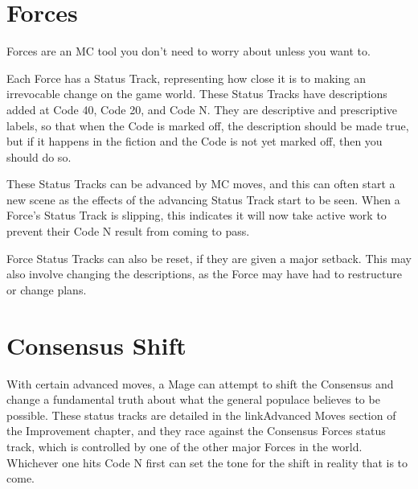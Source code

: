 \documentclass[
  oneside,
  statementpaper,
  9pt]{memoir}
\begin{document}
\hypertarget{forces-1}{%
\section{Forces}\label{forces-1}}

\begin{Player}

Forces are an MC tool you don't need to worry about unless you want to.

\end{Player}

\begin{MC}

Each Force has a Status Track, representing how close it is to making an irrevocable change on the game world. These Status Tracks have descriptions added at Code 40, Code 20, and Code N. They are descriptive and prescriptive labels, so that when the Code is marked off, the description should be made true, but if it happens in the fiction and the Code is not yet marked off, then you should do so.

These Status Tracks can be advanced by MC moves, and this can often start a new scene as the effects of the advancing Status Track start to be seen. When a Force’s Status Track is slipping, this indicates it will now take active work to prevent their Code N result from coming to pass.

Force Status Tracks can also be reset, if they are given a major setback. This may also involve changing the descriptions, as the Force may have had to restructure or change plans.

\end{MC}

\hypertarget{consensus-shift}{%
\section{Consensus Shift}\label{consensus-shift}}

\begin{Player}

With certain advanced moves, a Mage can attempt to shift the Consensus and change a fundamental truth about what the general populace believes to be possible. These status tracks are detailed in the {{linkAdvanced Moves}} section of the Improvement chapter, and they race against the Consensus Forces status track, which is controlled by one of the other major Forces in the world. Whichever one hits Code N first can set the tone for the shift in reality that is to come.

\end{Player}
\end{document}
